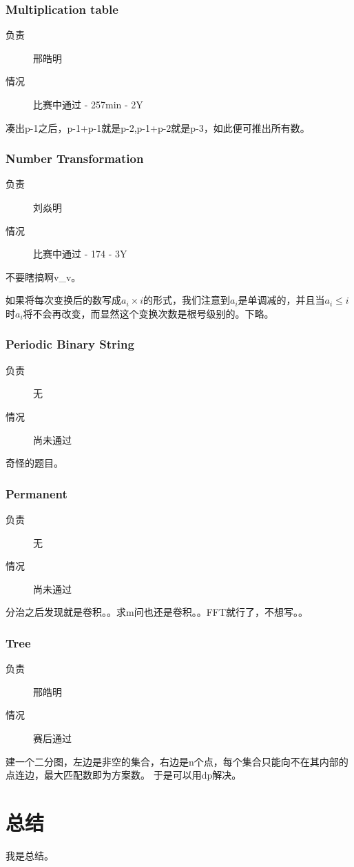 \documentclass[a4paper, 11pt, nofonts, nocap, fancyhdr]{ctexart}
\newcommand{\problem}[1]{\subsubsection{#1}}
\begin{document}
\problem{Multiplication table}

\begin{description}
\item[负责] 邢皓明
\item[情况] 比赛中通过 - 257min - 2Y
\end{description}

凑出p-1之后，p-1+p-1就是p-2,p-1+p-2就是p-3，如此便可推出所有数。

\problem{Number Transformation}

\begin{description}
\item[负责] 刘焱明
\item[情况] 比赛中通过 - 174 - 3Y
\end{description}

不要瞎搞啊v\_v。

如果将每次变换后的数写成$a_i \times i$的形式，我们注意到$a_i$是单调减的，并且当$a_i \leq i$时$a_i$将不会再改变，而显然这个变换次数是根号级别的。下略。

\problem{Periodic Binary String}

\begin{description}
\item[负责] 无
\item[情况] 尚未通过
\end{description}

奇怪的题目。

\problem{Permanent}

\begin{description}
\item[负责] 无
\item[情况] 尚未通过
\end{description}

分治之后发现就是卷积。。求m问也还是卷积。。FFT就行了，不想写。。

\problem{Tree}

\begin{description}
\item[负责] 邢皓明
\item[情况] 赛后通过
\end{description}

建一个二分图，左边是非空的集合，右边是n个点，每个集合只能向不在其内部的点连边，最大匹配数即为方案数。
于是可以用dp解决。

\section{总结}

我是总结。
\end{document}
